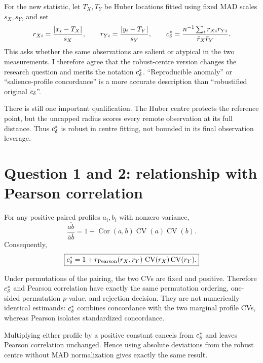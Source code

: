For the new statistic, let $T_X,T_Y$ be Huber locations fitted using fixed MAD
scales $s_X,s_Y$, and set
\begin{equation}
r_{Xi}=\frac{|x_i-T_X|}{s_X},\qquad
r_{Yi}=\frac{|y_i-T_Y|}{s_Y},\qquad
c_\delta^\ast=\frac{n^{-1}\sum_i r_{Xi}r_{Yi}}{\bar r_X\bar r_Y}.
\end{equation}
This asks whether the same observations are salient or atypical in the two
measurements. I therefore agree that the robust-centre version changes the
research question and merits the notation $c_\delta^\ast$. ``Reproducible anomaly'' or
``salience-profile concordance'' is a more accurate description than
``robustified original $c_\delta$''.

There is still one important qualification. The Huber centre protects the
reference point, but the uncapped radius scores every remote observation at
its full distance. Thus $c_\delta^\ast$ is robust in centre fitting, not bounded in its
final observation leverage.

\section{Question 1 and 2: relationship with Pearson correlation}

For any positive paired profiles $a_i,b_i$ with nonzero variance,
\begin{equation}
\frac{\overline{ab}}{\bar a\bar b}
=1+\operatorname{Cor}(a,b)\operatorname{CV}(a)\operatorname{CV}(b).
\label{eq:identity}
\end{equation}
Consequently,
\begin{equation}
\boxed{c_\delta^\ast=1+r_{\mathrm{Pearson}}(r_X,r_Y)\,
\operatorname{CV}(r_X)\operatorname{CV}(r_Y).}
\end{equation}

Under permutations of the pairing, the two CVs are fixed and positive.
Therefore $c_\delta^\ast$ and Pearson correlation have exactly the same permutation
ordering, one-sided permutation $p$-value, and rejection decision. They are
not numerically identical estimands: $c_\delta^\ast$ combines concordance with the two
marginal profile CVs, whereas Pearson isolates standardized concordance.

Multiplying either profile by a positive constant cancels from $c_\delta^\ast$ and
leaves Pearson correlation unchanged. Hence using absolute deviations from
the robust centre without MAD normalization gives exactly the same result.

